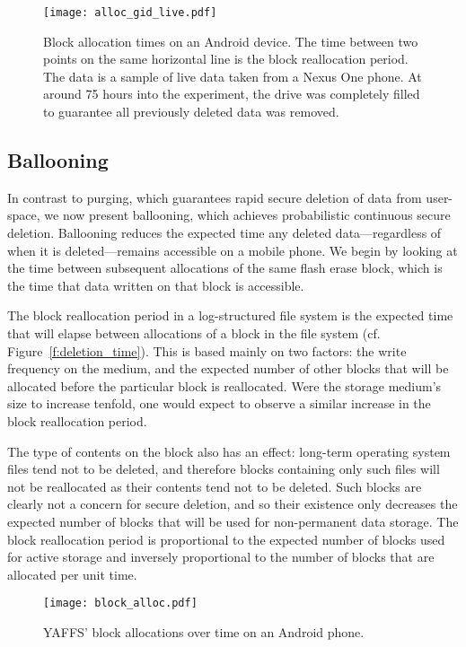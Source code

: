 \documentclass{acmtog}
\begin{document}
\begin{figure}[t]
\centering
\texttt{[image: alloc\_gid\_live.pdf]}
\caption{\small Block allocation times on an Android device. The time between
two points on the same horizontal line is the block
 reallocation period. The data is a sample of live data taken from a Nexus
 One phone. At around 75
hours into the experiment, the drive was completely filled to
guarantee all previously deleted data was removed.
\label{f:alloc_gid_live}\normalsize}
\end{figure}

\label{s:static_deletion}


\subsection{Ballooning}
In contrast to purging, which guarantees rapid
secure deletion of data from user-space, we now present ballooning, which
achieves probabilistic continuous secure deletion. Ballooning reduces
the expected time any deleted data---regardless of when it is deleted---remains accessible on a mobile phone. We begin
by looking at the time between subsequent allocations of the same flash  erase
block, which is the time  that data written on that block is accessible.


The block reallocation period in a log-structured file system is the expected time
that will elapse between allocations of a block in the file system (cf.
Figure~\ref{f:deletion_time}).
This is based mainly on two factors: the write frequency on the medium, and  the expected number of other blocks
that will be allocated before the particular block is reallocated. Were the
storage medium's size to increase tenfold, one would expect to observe a
similar increase in the block reallocation period. 

The type
of contents on the block also has an effect: 
long-term operating system files tend not to be deleted, and therefore blocks
containing only such files will not be reallocated as their
contents tend not to be deleted. Such blocks are clearly not a concern for secure
deletion, and so their existence only decreases the expected number of blocks
that will be used for non-permanent data storage.
The block reallocation period is proportional to the
expected number of blocks used for active storage and inversely proportional to the number of blocks that are
allocated per unit time.


\begin{figure}[t]
\centering
\texttt{[image: block\_alloc.pdf]}
\caption{\small YAFFS' block allocations over time  on an Android
phone. 
\label{f:block_alloc}\normalsize}
\end{figure}
\end{document}
